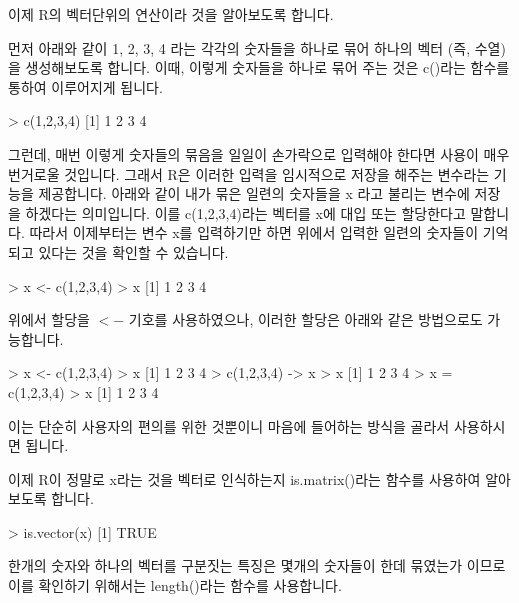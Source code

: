 \documentclass{book}
\begin{document}
이제 R의 벡터단위의 연산이라 것을 알아보도록 합니다. 

먼저 아래와 같이 1, 2, 3, 4 라는 각각의 숫자들을 하나로 묶어 하나의 벡터 (즉, 수열)을 생성해보도록 합니다. 
이때, 이렇게 숫자들을 하나로 묶어 주는 것은 c()라는 함수를 통하여 이루어지게 됩니다.

\begin{Schunk}
\begin{Soutput}
> c(1,2,3,4)
[1] 1 2 3 4
\end{Soutput}
\end{Schunk}

그런데, 매번 이렇게 숫자들의 묶음을 일일이 손가락으로 입력해야 한다면 사용이 매우 번거로울 것입니다. 
그래서 R은 이러한 입력을 임시적으로 저장을 해주는 변수라는 기능을 제공합니다. 
아래와 같이 내가 묶은 일련의 숫자들을 x 라고 불리는 변수에 저장을 하겠다는 의미입니다.
이를 c(1,2,3,4)라는 벡터를 x에 대입 또는 할당한다고 말합니다.
따라서 이제부터는 변수 x를 입력하기만 하면 위에서 입력한 일련의 숫자들이 기억되고 있다는 것을 확인할 수 있습니다. 

\begin{Schunk}
\begin{Soutput}
> x <- c(1,2,3,4)
> x
[1] 1 2 3 4
\end{Soutput}
\end{Schunk}

위에서 할당을 $<-$ 기호를 사용하였으나, 이러한 할당은 아래와 같은 방법으로도 가능합니다. 

\begin{Schunk}
	\begin{Soutput}
> x <- c(1,2,3,4)
> x
[1] 1 2 3 4
> c(1,2,3,4) -> x
> x
[1] 1 2 3 4
> x = c(1,2,3,4)		
> x
[1] 1 2 3 4
\end{Soutput}
\end{Schunk}

이는 단순히 사용자의 편의를 위한 것뿐이니 마음에 들어하는 방식을 골라서 사용하시면 됩니다. 

이제 R이 정말로 x라는 것을 벡터로 인식하는지 is.matrix()라는 함수를 사용하여 알아보도록 합니다. 

\begin{Schunk}
\begin{Soutput}
> is.vector(x)
[1] TRUE
\end{Soutput}
\end{Schunk}

한개의 숫자와 하나의 벡터를 구분짓는 특징은 몇개의 숫자들이 한데 묶였는가 이므로 이를 확인하기 위해서는 length()라는 함수를 사용합니다. 
\end{document}
